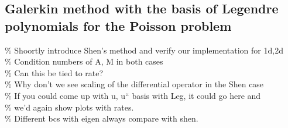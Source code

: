 \documentclass[a4paper,10pt]{article}
\begin{document}
  \subsection{Galerkin method with the basis of Legendre polynomials for the
  Poisson problem}
  \% Shoortly introduce Shen's method and verify our implementation for 1d,2d\\
  \% Condition numbers of A, M in both cases\\
  \% Can this be tied to rate?\\
  \% Why don't we see scaling of the differential operator in the Shen case\\
  \% If you could come up with u, u`` basis with Leg, it could go here and \\
  \% we'd again show plots with rates. \\
  \% Different bcs with eigen always compare with shen.
\end{document}
